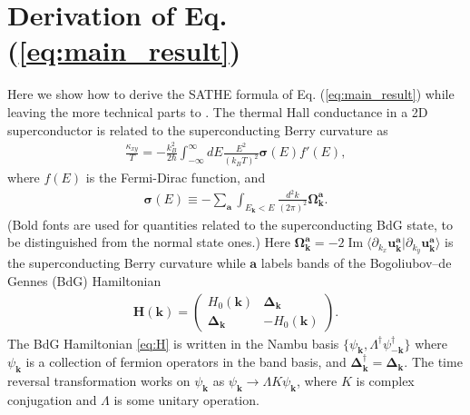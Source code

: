 \section{Derivation of Eq. (\ref{eq:main_result})}
Here we show how to derive the SATHE formula of Eq. (\ref{eq:main_result}) while leaving the more technical parts to \cite{SM}. The thermal Hall conductance in a 2D superconductor is  related to the superconducting Berry curvature \cite{qin2011energy,sumiyoshi2013quantum} as
\begin{align}
	\frac{\kappa_{xy}}{T}=-\frac{k_B^2}{2\hbar}\int_{-\infty}^\infty dE \frac{E^2}{(k_B T)^2} \boldsymbol{\sigma}(E) f'(E),\label{eq:kappa}
\end{align}
where $f(E)$ is the Fermi-Dirac function, and 
\begin{align}
	\boldsymbol{\sigma}(E)\equiv -\sum_\mathbf{a} \int_{E_{\bm{k}}<E} \frac{d^2k}{(2\pi)^2} \boldsymbol{\Omega}^\mathbf{a}_{\bm{k}}. \label{eq:sigma}
\end{align}
(Bold fonts are used for quantities related to the superconducting BdG state, to be distinguished from the normal state ones.) Here $\boldsymbol{\Omega}^\mathbf{a}_{\bm{k}}=-2\mathop{\mathrm{Im}}\langle\partial_{k_x} \mathbf{u}^\mathbf{a}_{\bm{k}}|\partial_{k_y} \mathbf{u}^\mathbf{a}_{\bm{k}}\rangle$ is the superconducting Berry curvature while $\mathbf{a}$ labels bands of the Bogoliubov–de Gennes (BdG) Hamiltonian
\begin{align}\label{eq:H}
\mathbf H(\bm{k})=\left(\begin{array}{cc}
		H_0(\bm{k}) & \boldsymbol{\Delta}_{\bm k} \\
		\boldsymbol{\Delta}_{\bm k} & -H_0(\bm{k})
	\end{array}\right).
\end{align}
The BdG Hamiltonian \eqref{eq:H} is written in the Nambu basis $\{\psi_{ \bm k},\Lambda^\dagger\psi_{-\bm k}^\dagger\}$ where $\psi_{\bm k}$ is a collection of fermion operators in the band basis, and $\boldsymbol{\Delta}_{\bm k}^\dagger=\boldsymbol{\Delta}_{\bm k}$. The time reversal transformation works on $\psi_{\bm k}$ as $\psi_ {\bm k}\rightarrow \Lambda K \psi_{\bm k}$, where $K$ is complex conjugation and $\Lambda$ is some unitary operation.  

